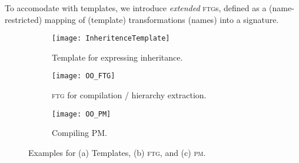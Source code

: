 To accomodate with templates, we introduce \emph{extended} \textsc{ftg}s, 
defined as a (name-restricted) mapping of (template) transformations (names) 
into a signature.

\begin{figure}
\centering
\begin{subfigure}[t]{0.3\linewidth}
\centering
\texttt{[image: InheritenceTemplate]}
\caption{Template for expressing inheritance.}
  \label{fig:InheritenceTemplate}
\end{subfigure}
\begin{subfigure}[t]{0.35\linewidth}
\centering
\texttt{[image: OO\_FTG]}
\caption{\textsc{ftg} for compilation / hierarchy extraction.}
\label{fig:OO_FTG}
\end{subfigure}
\begin{subfigure}[t]{0.3\linewidth}
\centering
\texttt{[image: OO\_PM]}
\caption{Compiling \textsc{PM}.}
\label{fig:OO_PM}
\end{subfigure}
\caption{Examples for (a) Templates, (b) \textsc{ftg}, and (c) \textsc{pm}.}
\end{figure}



